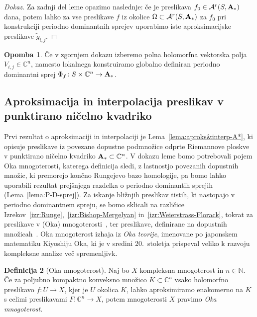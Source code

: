 \documentclass[12pt,a4paper,twoside]{article}
\theoremstyle{definition} %
\newtheorem{definicija}{Definicija}[section]
\newtheorem{opomba}[definicija]{Opomba}
\newenvironment{dokaz}[1][Dokaz]{\begin{proof}[#1]}{\end{proof}}
\theoremstyle{plain} %
\numberwithin{equation}{section}  %
\begin{document}
\begin{dokaz}
Za zadnji del leme opazimo naslednje: če je preslikava $f_{0} \in \mathcal{A}^{r}(S, \textbf{\textup{A}}_{*})$ dana, potem lahko za vse preslikave $f$ iz okolice $\Omega \subset \mathcal{A}^{r}(S, \textbf{\textup{A}}_{*})$ za $f_{0}$ pri konstrukciji periodno dominantnih sprejev uporabimo iste aproksimacijske preslikave $\tilde{g}_{i,j}$.
\end{dokaz}

\begin{opomba} \label{op:PDS-globalno}
Če v zgornjem dokazu izberemo polna holomorfna vektorska polja $V_{i,j} \in \mathbb{C}^{n}$, namesto lokalnega konstruiramo globalno definiran periodno dominantni sprej $\Phi_{f} \colon S \times \mathbb{C}^{n} \to \textbf{\textup{A}}_{*}$.
\end{opomba}

\subsection{Aproksimacija in interpolacija preslikav v punktirano ničelno kvadriko}
%
Prvi rezultat o aproksimaciji in interpolaciji je Lema~\ref{lema:aproks&interp-A*}, ki opisuje preslikave iz povezane dopustne podmnožice odprte Riemannove ploskve v punktirano ničelno kvadriko $\textbf{\textup{A}}_{*} \subset \mathbb{C}^{n}$.
V dokazu leme bomo potrebovali pojem Oka mnogoterosti, katerega definicija sledi, z lastnostjo povezanih dopustnih množic, ki premorejo končno Rungejevo bazo homologije, pa bomo lahko uporabili rezultat prejšnjega razdelka o periodno dominantih sprejih (Lema~\ref{lema:P-D-sprej}).
Za iskanje bližnjih preslikav tistih, ki nastopajo v periodno dominantnem spreju, se bomo sklicali na različice Izrekov~\ref{izr:Runge},~\ref{izr:Bishop-Mergelyan} in~\ref{izr:Weierstrass-Florack}, tokrat za preslikave v (Oka) mnogoterosti~\cite[Theorem~1.13.1,~1.13.3]{alarcon2021minimal},
ter preslikave, definirane na dopustnih množicah~\cite[Theorem~1.12.11]{alarcon2021minimal}.
Oka mnogoterost izhaja iz \emph{Oka teorije}, imenovane po japonskem matematiku Kiyoshiju Oka, ki je v sredini 20.~stoletja prispeval veliko k razvoju kompleksne analize več spremenljivk.

\begin{definicija} [Oka mnogoterost]
Naj bo $X$ kompleksna mnogoterost in $n \in \mathbb{N}$. Če za poljubno kompaktno konveksno množico $K \subset \mathbb{C}^{n}$ vsako holomorfno preslikavo $f \colon U \to X$, kjer je $U$ okolica $K$, lahko aproksimiramo enakomerno na $K$ s celimi preslikavami $F \colon \mathbb{C}^{n} \to X$, potem mnogoterosti $X$ pravimo \emph{Oka mnogoterost}.
\end{definicija}
\end{document}

